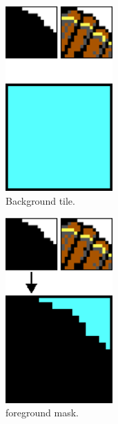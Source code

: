 \documentclass[book.tex]{subfiles}
\begin{document}
\begin{figure}[H]
\centering
 \begin{subfigure}{0.32\textwidth}
 	\centering
 	\includegraphics[width=0.45\textwidth]{screenshots_300dpi/game/mask_tiles_1.png}
 	\caption{Background tile.}
 \end{subfigure}
 \begin{subfigure}{0.32\textwidth}
 	\centering
 	\includegraphics[width=0.45\textwidth]{screenshots_300dpi/game/mask_tiles_2.png}
 	\caption{ foreground mask.}
 \end{subfigure}
 \begin{subfigure}{0.32\textwidth}
 	\centering

\end{subfigure}
\end{figure}
\end{document}
